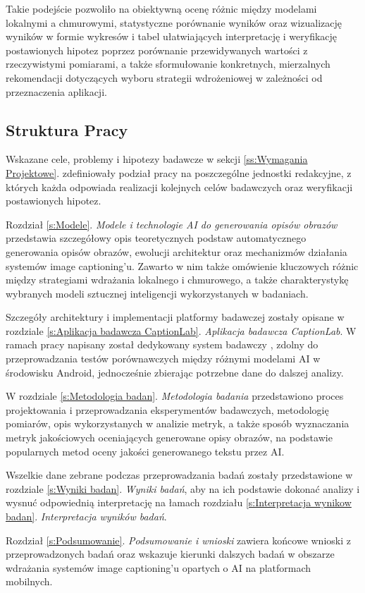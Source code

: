 Takie podejście pozwoliło na obiektywną ocenę różnic między modelami lokalnymi 
a chmurowymi, statystyczne porównanie wyników oraz 
wizualizację wyników w formie wykresów i tabel ułatwiających interpretację i weryfikację postawionych hipotez
poprzez porównanie przewidywanych wartości z rzeczywistymi pomiarami, a także sformułowanie 
konkretnych, mierzalnych rekomendacji dotyczących wyboru strategii wdrożeniowej w zależności 
od przeznaczenia aplikacji.


\subsection{Struktura Pracy}\label{ss:Struktura Pracy}

\noindent
Wskazane cele, problemy i hipotezy badawcze w sekcji \ref{ss:Wymagania Projektowe}. 
zdefiniowały podział pracy na poszczególne jednostki redakcyjne, 
z których każda odpowiada realizacji kolejnych celów badawczych oraz weryfikacji postawionych hipotez.

Rozdział \ref{s:Modele}. \textit{Modele i technologie AI do generowania opisów obrazów} przedstawia szczegółowy opis teoretycznych podstaw automatycznego generowania opisów obrazów, ewolucji architektur
oraz mechanizmów działania systemów image captioning'u. Zawarto w nim także omówienie kluczowych różnic między strategiami wdrażania lokalnego i chmurowego,
a także charakterystykę wybranych modeli sztucznej inteligencji wykorzystanych w badaniach.

Szczegóły architektury i implementacji platformy badawczej zostały opisane
w rozdziale \ref{s:Aplikacja badawcza CaptionLab}. \textit{Aplikacja badawcza CaptionLab}. W ramach pracy napisany został dedykowany system badawczy 
, zdolny do przeprowadzania
testów porównawczych między różnymi modelami AI w środowisku Android, jednocześnie zbierając potrzebne 
dane do dalszej analizy. 

W rozdziale \ref{s:Metodologia badan}. \textit{Metodologia badania} przedstawiono proces projektowania i przeprowadzania 
eksperymentów badawczych, metodologię pomiarów, opis wykorzystanych w analizie metryk, a także sposób wyznaczania 
metryk jakościowych oceniających generowane opisy obrazów, na podstawie popularnych metod oceny jakości generowanego tekstu przez AI.

Wszelkie dane zebrane podczas przeprowadzania badań zostały przedstawione w rozdziale \ref{s:Wyniki badan}. \textit{Wyniki badań},
aby na ich podstawie dokonać analizy i wysnuć odpowiednią interpretację na łamach rozdziału \ref{s:Interpretacja wynikow badan}. \textit{Interpretacja wyników badań}.

Rozdział \ref{s:Podsumowanie}. \textit{Podsumowanie i wnioski} zawiera końcowe wnioski z przeprowadzonych badań oraz wskazuje kierunki dalszych badań w obszarze wdrażania systemów
image captioning'u  opartych o AI na platformach mobilnych.

